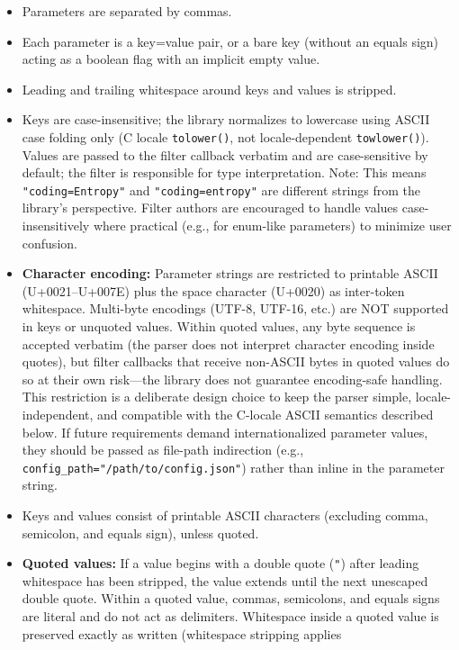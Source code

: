 \documentclass[../HDF5_RFC.tex]{subfiles}
\begin{document}
\begin{itemize}
\item Parameters are separated by commas.
\item Each parameter is a key=value pair, or a bare key (without an equals sign)
  acting as a boolean flag with an implicit empty value.
\item Leading and trailing whitespace around keys and values is stripped.
\item Keys are case-insensitive; the library normalizes to lowercase using ASCII
  case folding only (C locale \texttt{tolower()}, not locale-dependent
  \texttt{towlower()}). Values are passed to the filter callback verbatim and are
  case-sensitive by default; the filter is responsible for type interpretation.
  Note: This means \texttt{"coding=Entropy"} and \texttt{"coding=entropy"} are different
  strings from the library's perspective. Filter authors are encouraged to
  handle values case-insensitively where practical (e.g., for enum-like
  parameters) to minimize user confusion.
\item \textbf{Character encoding:} Parameter strings are restricted to printable
  ASCII (U+0021--U+007E) plus the space character (U+0020) as inter-token
  whitespace. Multi-byte encodings (UTF-8, UTF-16, etc.) are NOT supported in
  keys or unquoted values. Within quoted values, any byte sequence is accepted
  verbatim (the parser does not interpret character encoding inside quotes),
  but filter callbacks that receive non-ASCII bytes in quoted values do so at
  their own risk---the library does not guarantee encoding-safe handling. This
  restriction is a deliberate design choice to keep the parser simple,
  locale-independent, and compatible with the C-locale ASCII semantics
  described below. If future requirements demand internationalized parameter
  values, they should be passed as file-path indirection (e.g.,
  \texttt{config\_path="/path/to/config.json"}) rather than inline in the
  parameter string.
\item Keys and values consist of printable ASCII characters (excluding comma,
  semicolon, and equals sign), unless quoted.
\item \textbf{Quoted values:} If a value begins with a double quote (\texttt{"}) after
  leading whitespace has been stripped, the value extends until the next
  unescaped double quote. Within a quoted value, commas, semicolons, and
  equals signs are literal and do not act as delimiters. Whitespace inside a
  quoted value is preserved exactly as written (whitespace stripping applies

\end{itemize}
\end{document}
